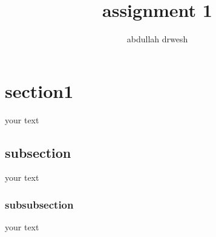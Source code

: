 \documentclass{article}
\title{assignment 1}
\author{abdullah drwesh}
\begin{document}
	\tableofcontents
	\newpage
	\maketitle
	\newpage
	\section{section1}
	your text
	\subsection{subsection}
	your text
	\subsubsection{subsubsection}
	your text
\end{document}
